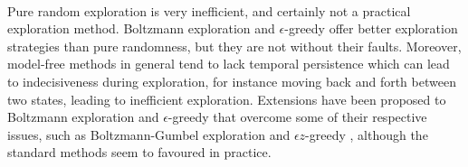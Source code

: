 \\Pure random exploration is very inefficient, and certainly not a practical exploration method. Boltzmann exploration and $\epsilon$-greedy offer better exploration strategies than pure randomness, but they are not without their faults. Moreover, model-free methods in general tend to lack temporal persistence which can lead to indecisiveness during exploration, for instance moving back and forth between two states, leading to inefficient exploration. Extensions have been proposed to Boltzmann exploration and $\epsilon$-greedy that overcome some of their respective issues, such as Boltzmann-Gumbel exploration \cite{DBLP:journals/corr/Cesa-BianchiGLN17} and $\epsilon z$-greedy \cite{dabney2021temporallyextended}, although the standard methods seem to favoured in practice.




